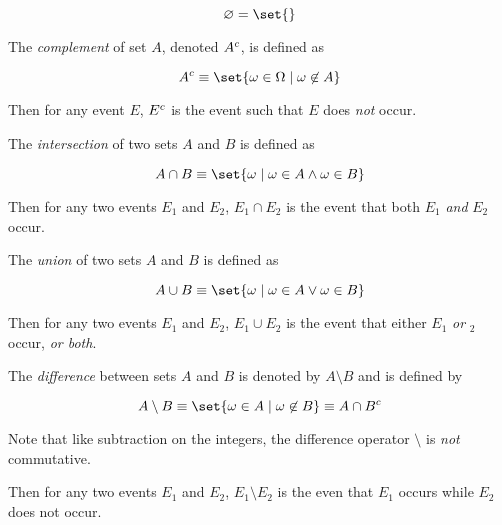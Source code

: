 \begin{definition}
    \begin{equation}
        \varnothing = \set{ }
    \end{equation}
\end{definition}

\begin{definition}
    The \textit{complement} of set $A$, denoted ${A}^{c}$, is defined as
    
    \begin{equation}
        \AbsComplement{A} \equiv \set{ \omega \in \Omega \given \omega \not\in A }
    \end{equation}
    
    Then for any event $E$, ${E}^{c}$ is the event such that $E$ does \textit{not} occur.
\end{definition}

\begin{definition}
    The \textit{intersection} of two sets $A$ and $B$ is defined as
    
    \begin{equation}
        A \cap B \equiv \set{ \omega \given \omega \in A \land \omega \in B }
    \end{equation}
    
    Then for any two events $E_1$ and $E_2$, $E_1 \cap E_2$ is the event that both $E_1$ \textit{and} $E_2$ occur.
\end{definition}

\begin{definition}
    The \textit{union} of two sets $A$ and $B$ is defined as
    
    \begin{equation}
        A \cup B \equiv \set{ \omega \given \omega \in A \lor \omega \in B }
    \end{equation}
    
    Then for any two events $E_1$ and $E_2$, $E_1 \cup E_2$ is the event that either $E_1$ \textit{or} $_2$ occur, \textit{or both}.
\end{definition}

\begin{definition}
    The \textit{difference} between sets $A$ and $B$ is denoted by $A \setminus B$ and is defined by

    \begin{equation}
        A \setminus B \equiv \set{ \omega \in A \given \omega \not\in B } \equiv A \cap \AbsComplement{B}
    \end{equation}
    
    Note that like subtraction on the integers, the difference operator $\setminus$ is \textit{not} commutative.
    
    Then for any two events $E_1$ and $E_2$, $E_1 \setminus E_2$ is the even that $E_1$ occurs while $E_2$ does not occur.
\end{definition}

